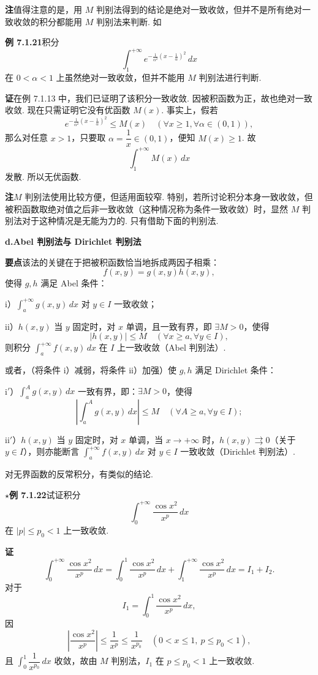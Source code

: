 \documentclass[UTF8,12pt,a4paper,fontset=fandol]{ctexart}
\begin{document}
\noindent\textbf{注}\quad 值得注意的是，用 $M$ 判别法得到的结论是绝对一致收敛，但并不是所有绝对一致收敛的积分都能用 $M$ 判别法来判断. 如

\noindent\textbf{例 7.1.21}\quad 积分
\[
\int_1^{+\infty}e^{-\frac1{\alpha^2}\left(x-\frac1\alpha\right)^2}\,dx
\]
在 $0<\alpha<1$ 上虽然绝对一致收敛，但并不能用 $M$ 判别法进行判断.

\noindent\textbf{证}\quad 在例 7.1.13 中，我们已证明了该积分一致收敛. 因被积函数为正，故也绝对一致收敛. 现在只需证明它没有优函数 $M(x)$. 事实上，假若
\[
e^{-\frac1{\alpha^2}\left(x-\frac1\alpha\right)^2}\le M(x)
\quad(\forall x\ge1,\forall\alpha\in(0,1)),
\]
那么对任意 $x>1$，只要取 $\alpha=\dfrac1x\in(0,1)$，便知 $M(x)\ge1$. 故
\[
\int_1^{+\infty}M(x)\,dx
\]
发散. 所以无优函数.

\noindent\textbf{注}\quad $M$ 判别法使用比较方便，但适用面较窄. 特别，若所讨论积分本身一致收敛，但被积函数取绝对值之后非一致收敛（这种情况称为条件一致收敛）时，显然 $M$ 判别法对于这种情况是无能为力的. 只有借助下面的判别法.

\noindent\textbf{d.\quad Abel 判别法与 Dirichlet 判别法}

\noindent\textbf{要点}\quad 该法的关键在于把被积函数恰当地拆成两因子相乘：
\[
f(x,y)=g(x,y)h(x,y),
\]
使得 $g,h$ 满足 Abel 条件：

i）$\displaystyle\int_a^{+\infty}g(x,y)\,dx$ 对 $y\in I$ 一致收敛；

ii）$h(x,y)$ 当 $y$ 固定时，对 $x$ 单调，且一致有界，即 $\exists M>0$，使得
\[
|h(x,y)|\le M\quad(\forall x\ge a,\forall y\in I),
\]
则积分 $\displaystyle\int_a^{+\infty}f(x,y)\,dx$ 在 $I$ 上一致收敛（Abel 判别法）.

或者，（将条件 i）减弱，将条件 ii）加强）使 $g,h$ 满足 Dirichlet 条件：

i$'$）$\displaystyle\int_a^A g(x,y)\,dx$ 一致有界，即：$\exists M>0$，使得
\[
\left|\int_a^A g(x,y)\,dx\right|\le M\quad(\forall A\ge a,\forall y\in I);
\]

ii$'$）$h(x,y)$ 当 $y$ 固定时，对 $x$ 单调，当 $x\to+\infty$ 时，$h(x,y)\rightrightarrows0$（关于 $y\in I$），则亦能断言 $\displaystyle\int_a^{+\infty}f(x,y)\,dx$ 对 $y\in I$ 一致收敛（Dirichlet 判别法）.

对无界函数的反常积分，有类似的结论.

\noindent\textbf{$\star$例 7.1.22}\quad 试证积分
\[
\int_0^{+\infty}\frac{\cos x^2}{x^p}\,dx
\]
在 $|p|\le p_0<1$ 上一致收敛.

\noindent\textbf{证}\quad
\[
\int_0^{+\infty}\frac{\cos x^2}{x^p}\,dx
=\int_0^1\frac{\cos x^2}{x^p}\,dx+\int_1^{+\infty}\frac{\cos x^2}{x^p}\,dx
=I_1+I_2.
\]
对于
\[
I_1=\int_0^1\frac{\cos x^2}{x^p}\,dx,
\]
因
\[
\left|\frac{\cos x^2}{x^p}\right|\le\frac1{x^p}\le\frac1{x^{p_0}}\quad(0<x\le1,\ p\le p_0<1),
\]
且 $\displaystyle\int_0^1\dfrac1{x^{p_0}}\,dx$ 收敛，故由 $M$ 判别法，$I_1$ 在 $p\le p_0<1$ 上一致收敛.
\end{document}
